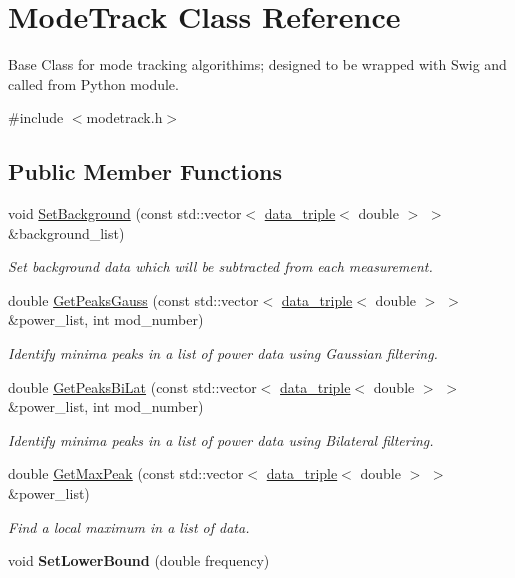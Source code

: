 \hypertarget{class_mode_track}{\section{Mode\+Track Class Reference}
\label{class_mode_track}
}


Base Class for mode tracking algorithims; designed to be wrapped with Swig and called from Python module.  




{\ttfamily \#include $<$modetrack.\+h$>$}

\subsection*{Public Member Functions}
\begin{DoxyCompactItemize}
\item 
void \hyperlink{class_mode_track_a3163e67113b3a93cb9fde40cba8dc813}{Set\+Background} (const std\+::vector$<$ \hyperlink{structdata__triple}{data\+\_\+triple}$<$ double $>$ $>$ \&background\+\_\+list)
\begin{DoxyCompactList}\small\item\em Set background data which will be subtracted from each measurement. \end{DoxyCompactList}\item 
double \hyperlink{class_mode_track_a2b3cc468fae5bca487871ad2b71fc974}{Get\+Peaks\+Gauss} (const std\+::vector$<$ \hyperlink{structdata__triple}{data\+\_\+triple}$<$ double $>$ $>$ \&power\+\_\+list, int mod\+\_\+number)
\begin{DoxyCompactList}\small\item\em Identify minima peaks in a list of power data using Gaussian filtering. \end{DoxyCompactList}\item 
double \hyperlink{class_mode_track_a974e74566b3baf1343d5942a6af7445e}{Get\+Peaks\+Bi\+Lat} (const std\+::vector$<$ \hyperlink{structdata__triple}{data\+\_\+triple}$<$ double $>$ $>$ \&power\+\_\+list, int mod\+\_\+number)
\begin{DoxyCompactList}\small\item\em Identify minima peaks in a list of power data using Bilateral filtering. \end{DoxyCompactList}\item 
double \hyperlink{class_mode_track_ab471ed8393b84636edb129d1c77b4df4}{Get\+Max\+Peak} (const std\+::vector$<$ \hyperlink{structdata__triple}{data\+\_\+triple}$<$ double $>$ $>$ \&power\+\_\+list)
\begin{DoxyCompactList}\small\item\em Find a local maximum in a list of data. \end{DoxyCompactList}\item 
\hypertarget{class_mode_track_a99eeeb6757873474994a61dbd7e31e43}{void {\bfseries Set\+Lower\+Bound} (double frequency)}\label{class_mode_track_a99eeeb6757873474994a61dbd7e31e43}


\end{DoxyCompactItemize}
